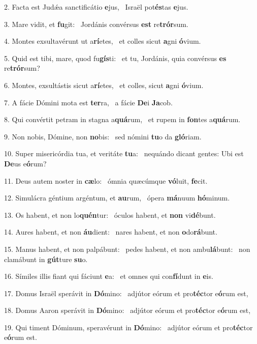 2. Facta est Judǽa sanctificátio \textbf{e}jus, \ast\  Israël pot\textbf{és}tas \textbf{e}jus.\

3. Mare vidit, et \textbf{fu}git: \ast\  Jordánis convérsus \textbf{est} re\textbf{trór}sum.\

4. Montes exsultavérunt ut a\textbf{rí}etes, \ast\  et colles sicut \textbf{a}gni \textbf{ó}vium.\

5. Quid est tibi, mare, quod fu\textbf{gís}ti: \ast\  et tu, Jordánis, quia convérsus \textbf{es} re\textbf{trór}sum?\

6. Montes, exsultástis sicut a\textbf{rí}etes, \ast\  et colles, sicut \textbf{a}gni \textbf{ó}vium.\

7. A fácie Dómini mota est \textbf{ter}ra, \ast\  a fácie \textbf{De}i \textbf{Ja}cob.\

8. Qui convértit petram in stagna a\textbf{quá}rum, \ast\  et rupem in \textbf{fon}tes a\textbf{quá}rum.\

9. Non nobis, Dómine, non \textbf{no}bis: \ast\  sed nómini \textbf{tu}o da \textbf{gló}riam.\

10. Super misericórdia tua, et veritáte \textbf{tu}a: \ast\  nequándo dicant gentes: Ubi est \textbf{De}us e\textbf{ó}rum?\

11. Deus autem noster in \textbf{cæ}lo: \ast\  ómnia quæcúmque \textbf{vó}luit, \textbf{fe}cit.\

12. Simulácra géntium argéntum, et \textbf{au}rum, \ast\  ópera \textbf{má}nuum \textbf{hó}minum.\

13. Os habent, et non lo\textbf{quén}tur: \ast\  óculos habent, et \textbf{non} vi\textbf{dé}bunt.\

14. Aures habent, et non \textbf{áu}dient: \ast\  nares habent, et non \textbf{o}do\textbf{rá}bunt.\

15. Manus habent, et non palpábunt: \dag\  pedes habent, et non ambu\textbf{lá}bunt: \ast\  non clamábunt in \textbf{gút}ture \textbf{su}o.\

16. Símiles illis fiant qui fáciunt \textbf{e}a: \ast\  et omnes qui con\textbf{fí}dunt in \textbf{e}is.\

17. Domus Israël sperávit in \textbf{Dó}mino: \ast\  adjútor eórum et pro\textbf{téc}tor e\textbf{ó}rum est,\

18. Domus Aaron sperávit in \textbf{Dó}mino: \ast\  adjútor eórum et pro\textbf{téc}tor e\textbf{ó}rum est,\

19. Qui timent Dóminum, speravérunt in \textbf{Dó}mino: \ast\  adjútor eórum et pro\textbf{téc}tor e\textbf{ó}rum est.\

